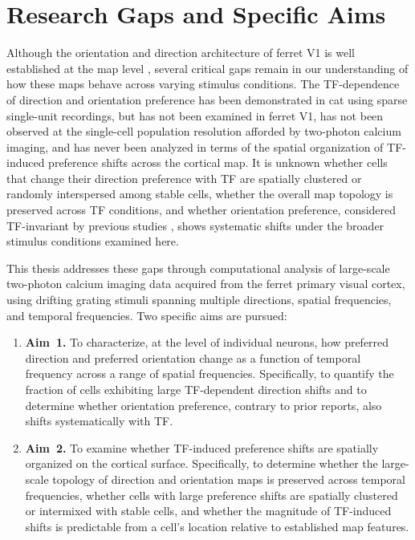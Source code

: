 \documentclass{brandeis-thesis3.3}
\begin{document}
\section{Research Gaps and Specific Aims}

Although the orientation and direction architecture of ferret V1 is well
established at the map level \citep{Weliky1996, Bonhoeffer1991,
Ohki2006}, several critical gaps remain in our understanding of how
these maps behave across varying stimulus conditions. The
TF-dependence of direction and orientation preference has been
demonstrated in cat using sparse single-unit recordings, but has not
been examined in ferret V1, has not been observed at the single-cell
population resolution afforded by two-photon calcium imaging, and has
never been analyzed in terms of the spatial organization of TF-induced
preference shifts across the cortical map. It is unknown whether cells
that change their direction preference with TF are spatially clustered
or randomly interspersed among stable cells, whether the overall map
topology is preserved across TF conditions, and whether orientation
preference, considered TF-invariant by previous studies \citep{Moore2005}, 
shows systematic shifts under the broader stimulus conditions examined here.

This thesis addresses these gaps through computational analysis of
large-scale two-photon calcium imaging data acquired from the ferret primary
visual cortex, using drifting grating stimuli spanning multiple
directions, spatial frequencies, and temporal frequencies. Two specific
aims are pursued:

\begin{enumerate}
  \item\textbf{Aim~1.}
    \label{aim:cellevel}
    To characterize, at the level of individual neurons, how preferred
    direction and preferred orientation change as a function of temporal
    frequency across a range of spatial frequencies. Specifically, to
    quantify the fraction of cells exhibiting large TF-dependent
    direction shifts and to determine whether orientation preference, 
    contrary to prior reports, also shifts systematically with TF.

  \item\textbf{Aim~2.}
    \label{aim:maplevel}
    To examine whether TF-induced preference shifts are spatially
    organized on the cortical surface. Specifically, to determine
    whether the large-scale topology of direction and orientation maps
    is preserved across temporal frequencies, whether cells with large
    preference shifts are spatially clustered or intermixed with stable
    cells, and whether the magnitude of TF-induced shifts is
    predictable from a cell's location relative to established map
    features.
\end{enumerate}
\end{document}
